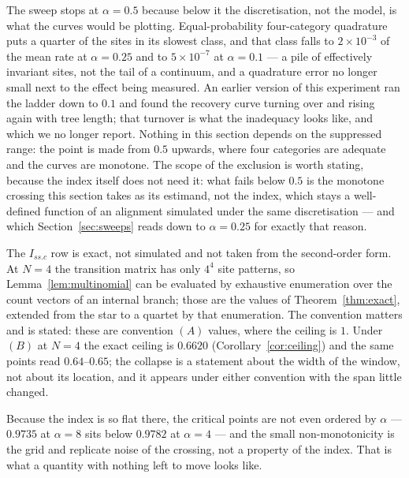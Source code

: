 \documentclass[11pt]{article}
\newcommand{\Issc}{I_{ss.c}}
\theoremstyle{definition}
\theoremstyle{remark}
\begin{document}
\begin{sloppypar}
The sweep stops at $\alpha=0.5$ because below it the discretisation, not the
model, is what the curves would be plotting. Equal-probability four-category
quadrature puts a quarter of the sites in its slowest class, and that class
falls to $2\times10^{-3}$ of the mean rate at $\alpha=0.25$ and to
$5\times10^{-7}$ at $\alpha=0.1$ --- a pile of effectively invariant sites,
not the tail of a continuum, and a quadrature error no longer small next to
the effect being measured. An earlier version of this experiment ran the
ladder down to $0.1$ and found the recovery curve turning over and rising
again with tree length; that turnover is what the inadequacy looks like, and
which we no longer report. Nothing in this section depends on the suppressed
range: the point is made from $0.5$ upwards, where four categories are
adequate and the curves are monotone. The scope of the exclusion is worth
stating, because the index itself does not need it: what fails below $0.5$ is
the monotone crossing this section takes as its estimand, not the index, which
stays a well-defined function of an alignment simulated under the same
discretisation --- and which Section~\ref{sec:sweeps} reads down to
$\alpha=0.25$ for exactly that reason.

The $\Issc$ row is exact, not simulated and not taken from the second-order
form. At $N=4$ the transition matrix has only $4^4$ site patterns, so
Lemma~\ref{lem:multinomial} can be evaluated by exhaustive enumeration over
the count vectors of an internal branch; those are the values of
Theorem~\ref{thm:exact}, extended from the star to a quartet by that
enumeration. The convention matters and is stated: these are convention $(A)$
values, where the ceiling is $1$. Under $(B)$ at $N=4$ the exact ceiling is
$0.6620$ (Corollary~\ref{cor:ceiling}) and the same points read
$0.64$--$0.65$; the collapse is a statement about the width of the window,
not about its location, and it appears under either convention with the span
little changed.

Because the index is so flat there, the critical points are not even ordered
by $\alpha$ --- $0.9735$ at $\alpha=8$ sits below $0.9782$ at $\alpha=4$ ---
and the small non-monotonicity is the grid and replicate noise of the
crossing, not a property of the index. That is what a quantity with nothing
left to move looks like.


\end{sloppypar}
\end{document}
